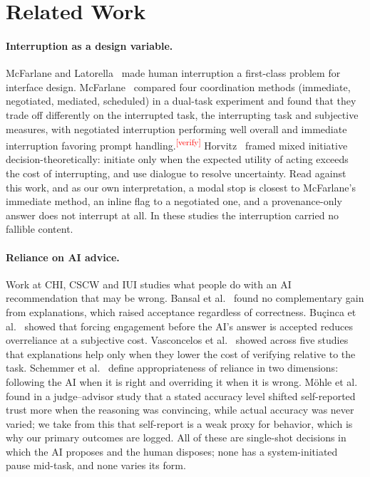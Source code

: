 \documentclass[sigconf,nonacm]{acmart}
\newcommand{\verify}{\textsuperscript{\textcolor{red}{[verify]}}}
\begin{document}
\section{Related Work}
\label{sec:related}

\paragraph{Interruption as a design variable.}
McFarlane and Latorella~\cite{mcfarlane2002scope} made human interruption
a first-class problem for interface design.
McFarlane~\cite{mcfarlane2002comparison} compared four coordination
methods (immediate, negotiated, mediated, scheduled) in a dual-task
experiment and found that they trade off differently on the interrupted
task, the interrupting task and subjective measures, with negotiated
interruption performing well overall and immediate interruption favoring
prompt handling.\verify{}
Horvitz~\cite{horvitz1999} framed mixed initiative decision-theoretically:
initiate only when the expected utility of acting exceeds the cost of
interrupting, and use dialogue to resolve uncertainty. Read against this
work, and as our own interpretation, a modal stop is closest to
McFarlane's immediate method, an inline flag to a negotiated one, and a
provenance-only answer does not interrupt at all. In these studies the
interruption carried no fallible content.

\paragraph{Reliance on AI advice.}
Work at CHI, CSCW and IUI studies what people do with an AI recommendation
that may be wrong. Bansal et al.~\cite{bansal2021} found no complementary
gain from explanations, which raised acceptance regardless of correctness.
Bu\c{c}inca et al.~\cite{bucinca2021} showed that forcing engagement before
the AI's answer is accepted reduces overreliance at a subjective cost.
Vasconcelos et al.~\cite{vasconcelos2023} showed across five studies that
explanations help only when they lower the cost of verifying relative to
the task. Schemmer et al.~\cite{schemmer2023} define appropriateness of
reliance in two dimensions: following the AI when it is right and
overriding it when it is wrong. M\"ohle et al.~\cite{mohle2026} found in a
judge--advisor study that a stated accuracy level shifted self-reported
trust more when the reasoning was convincing, while actual accuracy was
never varied; we take from this that self-report is a weak proxy for
behavior, which is why our primary outcomes are logged. All of these are
single-shot decisions in which the AI proposes and the human disposes; none
has a system-initiated pause mid-task, and none varies its form.
\end{document}
